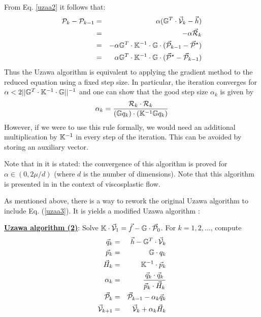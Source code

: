 From Eq. \ref{uzaa2} it follows that:
\begin{eqnarray}
{\cal P}_k - {\cal P}_{k-1}  
&=& \alpha (\mathbb{G}^T\cdot \vec{\cal V}_k -\vec h) \\
&=& -\alpha \vec{\cal R}_k \\ 
&=& -\alpha \mathbb{G}^T \cdot \mathbb{K}^{-1} \cdot \mathbb{G}\cdot (\vec {\cal P}_{k-1} - \vec{\cal P}^\star)\\ 
&=& \alpha \mathbb{G}^T \cdot \mathbb{K}^{-1} \cdot \mathbb{G}\cdot 
(\vec{\cal P}^\star - \vec {\cal P}_{k-1} ) 
\end{eqnarray}
Thus the Uzawa algorithm is equivalent to applying the gradient method 
to the reduced equation using a fixed step size. 
In particular, the iteration converges for
$
\alpha < 2 || {\mathbb{G}}^T \cdot {\mathbb{K}}^{-1} \cdot {\mathbb{G}} ||^{-1}
$
and one can show that the good step size $\alpha_k$ is given by 
\begin{equation}
\alpha_k = \frac{{\cal R}_k \cdot {\cal R}_k}{({\mathbb{G}} q_k)\cdot ({\mathbb{K}}^{-1} {\mathbb{G}} q_k)}
\label{uzaa3}
\end{equation}
However, if we were to use this rule formally, we would 
need an additional multiplication by ${\mathbb{K}}^{-1}$ in every step 
of the iteration. This can be avoided by storing an 
auxiliary vector. 

Note that in \cite{glow} it is stated: the convergence of this algorithm is proved for 
$\alpha \in (0,2\mu/d)$ (where $d$ is the number of dimensions).
Note that this algorithm is presented in \cite{zivt85} in the context of viscosplastic flow.


As mentioned above, there is a way to rework the original Uzawa algorithm 
to include Eq. (\ref{uzaa3}). It is yields a modified 
Uzawa algorithm \cite[p221]{braess}:


\begin{mdframed}[backgroundcolor=blue!5]
\underline{\bf Uzawa algorithm (2)}:
Solve $\mathbb{K}\cdot \vec{\cal V}_1 = \vec f - \mathbb{G}\cdot  \vec{\cal P}_0$. 
For $k=1,2,...$, compute 
\begin{eqnarray}
\vec q_k &=& \vec h-\mathbb{G}^T \cdot \vec{\cal V}_k \\
\vec{p}_k &=& {{\mathbb{G}}}\cdot q_k \\
\vec H_k &=& {{\mathbb{K}}}^{-1}\cdot \vec{p}_k \\
\alpha_k &=& \frac{\vec q_k \cdot \vec q_k}{\vec{p}_k \cdot \vec H_k} \\
\vec {\cal P}_k &=& \vec {\cal P}_{k-1} - \alpha_k  \vec q_k \\
\vec {\cal V}_{k+1} &=& \vec {\cal V}_k + \alpha_k  \vec H_k
\end{eqnarray}
\end{mdframed}























